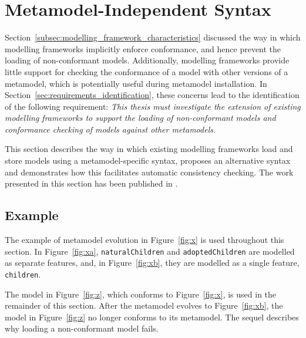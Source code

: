 
\section{Metamodel-Independent Syntax}
\label{sec:mmi_syntax}
Section~\ref{subsec:modelling_framework_characteristics} discussed the way in which modelling frameworks implicitly enforce conformance, and hence prevent the loading of non-conformant models. Additionally, modelling frameworks provide little support for checking the conformance of a model with other versions of a metamodel, which is potentially useful during metamodel installation. In Section~\ref{sec:requirements_identification}, these concerns lead to the identification of the following requirement: \emph{This thesis must investigate the extension of existing modelling frameworks to support the loading of non-conformant models and conformance checking of models against other metamodels.}

This section describes the way in which existing modelling frameworks load and store models using a metamodel-specific syntax, proposes an alternative syntax and demonstrates how this facilitates automatic consistency checking. The work presented in this section has been published in \cite{rose09enhanced}.


\subsection{Example} %
The example of metamodel evolution in Figure~\ref{fig:x} is used throughout this section. In Figure~\ref{fig:xa}, \texttt{na\-tu\-r\-alCh\-il\-dr\-en} and \texttt{ad\-op\-t\-edCh\-il\-dr\-en} are modelled as separate features, and, in Figure~\ref{fig:xb}, they are modelled as a single feature, \texttt{ch\-il\-dr\-en}.



The model in Figure~\ref{fig:z}, which conforms to Figure~\ref{fig:x}, is used in the remainder of this section. After the metamodel evolves to Figure~\ref{fig:xb}, the model in Figure~\ref{fig:z} no longer conforms to its metamodel. The sequel describes why loading a non-conformant model fails.



